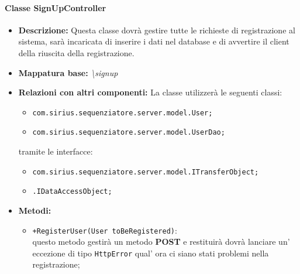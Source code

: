 \paragraph{Classe SignUpController}%
\begin{itemize}
	\item \textbf{Descrizione: } Questa classe dovrà gestire tutte le richieste di registrazione al sistema, sarà incaricata di inserire i dati nel database e di avvertire il client della riuscita della registrazione.
	\item \textbf{Mappatura base: }\textit{\textbackslash signup}
	\item \textbf{Relazioni con altri componenti: }
	La classe utilizzerà le seguenti classi:
	\begin{itemize}
		\item \texttt{com.sirius.sequenziatore.server.model.User;}
		\item \texttt{com.sirius.sequenziatore.server.model.UserDao;}
	\end{itemize}
	tramite le interfacce:
	\begin{itemize}
		\item \texttt{com.sirius.sequenziatore.server.model.ITransferObject;}
		\item \texttt{\sModel .IDataAccessObject;}
	\end{itemize}
	\item \textbf{Metodi: }\begin{itemize}
					\item \texttt{+RegisterUser(User toBeRegistered)}:\\
					 questo metodo gestirà un metodo \textbf{POST} e restituirà dovrà lanciare un' eccezione di tipo \texttt{HttpError} qual' ora ci siano stati problemi nella registrazione;
				\end{itemize}
\end{itemize}
